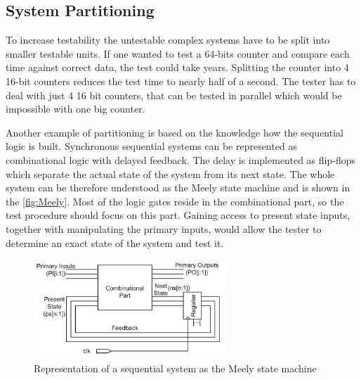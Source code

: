 \subsection{System Partitioning}
To increase testability the untestable complex systems have to be split into smaller testable units. If one wanted to test a 64-bits counter and compare each time against correct data, the test could take years. Splitting the counter into 4 16-bit counters reduces the test time to nearly half of a second. The tester has to deal with just 4 16 bit counters, that can be tested in parallel which would be impossible with one big counter.

Another example of partitioning is based on the knowledge how the sequential logic is built. Synchronous sequential systems can be represented as combinational logic with delayed feedback. The delay is implemented as flip-flops which separate the actual state of the system from its next state. The whole system can be therefore understood as the Meely state machine and is shown in the \autoref{fig:Meely}. Most of the logic gates reside in the combinational part, so the test procedure should focus on this part. Gaining access to present state inputs, together with manipulating the primary inputs, would allow the tester to determine an exact state of the system and test it.

\begin{figure}[H]
\centering
\includegraphics[width=0.65\textwidth]{figures/Meely.PNG}
\caption{Representation of a sequential system as the Meely state machine \cite{book:Navabi}}
\label{fig:Meely}
\end{figure}

